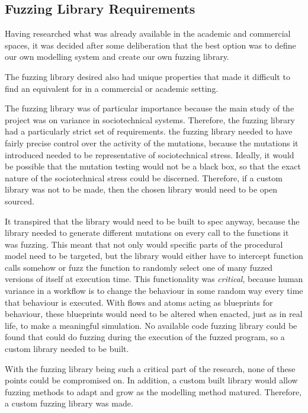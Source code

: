 \documentclass{sig-alternate}
\begin{document}
\subsection{Fuzzing Library Requirements}\label{planning_fuzzing}
Having researched what was already available in the academic and commercial spaces, it was decided after some deliberation that the best option was to define our own modelling system and create our own fuzzing library.  \par 
The fuzzing library desired also had unique properties that made it difficult to find an equivalent for in a commercial or academic setting. \par
The fuzzing library was of particular importance because the main study of the project was on variance in sociotechnical systems. Therefore, the fuzzing library had a particularly strict set of requirements. the fuzzing library needed to have fairly precise control over the activity of the mutations, because the mutations it introduced needed to be representative of sociotechnical stress. Ideally, it would be possible that the mutation testing would not be a black box, so that the exact nature of the sociotechnical stress could be discerned. Therefore, if a custom library was not to be made, then the chosen library would need to be open sourced. \par
It transpired that the library would need to be built to spec anyway, because the library needed to generate different mutations on every call to the functions it was fuzzing. This meant that not only would specific parts of the procedural model need to be targeted, but the library would either have to intercept function calls somehow or fuzz the function to randomly select one of many fuzzed versions of itself at execution time. This functionality was \emph{critical}, because human variance in a workflow is to change the behaviour in some random way every time that behaviour is executed. With flows and atoms acting as blueprints for behaviour, these blueprints would need to be altered when enacted, just as in real life, to make a meaningful simulation. No available code fuzzing library could be found that could do fuzzing during the execution of the fuzzed program, so a custom library needed to be built. \par
With the fuzzing library being such a critical part of the research, none of these points could be compromised on. In addition, a custom built library would allow fuzzing methods to adapt and grow as the modelling method matured. Therefore, a custom fuzzing library was made. \par
\end{document}
